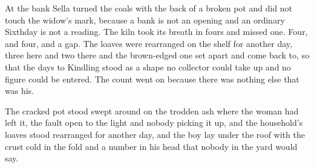 At the bank Sella turned the coals with the back of a broken pot and did not touch the widow's mark, because a bank is not an opening and an ordinary Sixthday is not a reading. The kiln took its breath in fours and missed one. Four, and four, and a gap. The loaves were rearranged on the shelf for another day, three here and two there and the brown-edged one set apart and come back to, so that the days to Kindling stood as a shape no collector could take up and no figure could be entered. The count went on because there was nothing else that was his.

The cracked pot stood swept around on the trodden ash where the woman had left it, the fault open to the light and nobody picking it up, and the household's loaves stood rearranged for another day, and the boy lay under the roof with the crust cold in the fold and a number in his head that nobody in the yard would say.

